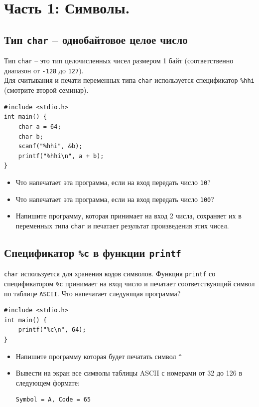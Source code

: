 \documentclass{article}
\begin{document}
\section*{Часть 1: Символы.}
\subsection*{Тип \texttt{char} -- однобайтовое целое число}
Тип \texttt{char} -- это тип целочисленных чисел размером 1 байт (соответственно диапазон от \texttt{-128} до \texttt{127}).\\
Для считывания и печати переменных типа \texttt{char} используется спецификатор \texttt{\%hhi} (смотрите второй семинар).
\begin{lstlisting}
#include <stdio.h>
int main() {
    char a = 64;
    char b;
    scanf("%hhi", &b);
    printf("%hhi\n", a + b);
}
\end{lstlisting}
\begin{itemize}
\item Что напечатает эта программа, если на вход передать число \texttt{10}?
\item Что напечатает эта программа, если на вход передать число \texttt{100}?
\item Напишите программу, которая принимает на вход 2 числа, сохраняет их в переменных типа \texttt{char} и печатает результат произведения этих чисел.
\end{itemize}

\subsection*{Спецификатор \texttt{\%c} в функции \texttt{printf}}
\texttt{char} используется для хранения кодов символов. Функция \texttt{printf} со спецификатором \texttt{\%c} принимает на вход число и печатает соответствующий символ по таблице \texttt{ASCII}. Что напечатает следующая программа?
\begin{lstlisting}
#include <stdio.h>
int main() {
    printf("%c\n", 64);
}
\end{lstlisting}
\begin{itemize}
\item Напишите программу которая будет печатать символ \texttt{\^}
\item Вывести на экран все символы таблицы ASCII с номерами от 32 до 126 в следующем формате: 
\begin{lstlisting}
Symbol = A, Code = 65
\end{lstlisting}
\end{itemize}
\end{document}
